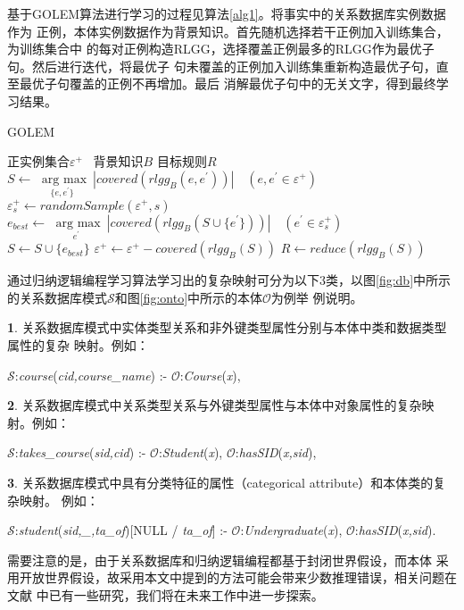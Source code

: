 基于GOLEM算法进行学习的过程见算法\ref{alg1}。将事实中的关系数据库实例数据作为
正例，本体实例数据作为背景知识。首先随机选择若干正例加入训练集合，为训练集合中
的每对正例构造RLGG，选择覆盖正例最多的RLGG作为最优子句。然后进行迭代，将最优子
句未覆盖的正例加入训练集重新构造最优子句，直至最优子句覆盖的正例不再增加。最后
消解最优子句中的无关文字，得到最终学习结果。
\renewcommand{\algorithmicinput}{\textbf{输入：}}
\renewcommand{\algorithmicoutput}{\textbf{输出：}}


\begin{algorithm}                      
\caption{GOLEM}          
\label{alg1}                           
\begin{algorithmic}[1]                    
\INPUT 正实例集合$\varepsilon^+$ \ 背景知识$B$
\OUTPUT 目标规则$R$
	\STATE $S \leftarrow \underset{\{e,e^\prime\}}{\operatorname{\ arg \ max}} \ |covered(rlgg_B(e,e^\prime))| \quad (e, e^\prime \in \varepsilon^+)$
	\REPEAT
	\STATE $ \varepsilon^+_s \leftarrow randomSample(\varepsilon^+,s)$ \\
	\STATE $e_{best} \leftarrow \underset{e^\prime}{\operatorname{\ arg \ max}} \ |covered(rlgg_B(S \cup \{e^\prime\}))|  \quad (e^\prime \in \varepsilon^+_s)$ \\
	\STATE $ S \leftarrow S \cup \{e_{best}\} $
	\STATE $ \varepsilon^+ \leftarrow \varepsilon^+ - covered(rlgg_B(S))$
	\STATE $ R \leftarrow reduce(rlgg_B(S))$
\end{algorithmic}
\end{algorithm}


通过归纳逻辑编程学习算法学习出的复杂映射可分为以下3类，以图\ref{fig:db}中所示
的关系数据库模式$\mathcal{S}$和图\ref{fig:onto}中所示的本体$\mathcal{O}$为例举
例说明。

\theoremstyle{definition}
\newtheorem{type}{}
\begin{type}
\label{typ1}
关系数据库模式中实体类型关系和非外键类型属性分别与本体中类和数据类型属性的复杂
映射。例如：

$\mathcal{S}$:\emph{course}(\emph{cid,course\_name}) :-
$\mathcal{O}$:\emph{Course}(\emph{x}),
\end{type}
\begin{type}
\label{typ2}
关系数据库模式中关系类型关系与外键类型属性与本体中对象属性的复杂映射。例如： 

$\mathcal{S}$:\emph{takes\_course}(\emph{sid,cid}) :-
$\mathcal{O}$:\emph{Student}(\emph{x}),
$\mathcal{O}$:\emph{hasSID}(\emph{x,sid}),
\end{type}
\begin{type}
\label{typ3}
关系数据库模式中具有分类特征的属性（categorical attribute）和本体类的复杂映射。
例如：

$\mathcal{S}$:\emph{student}(\emph{sid,\_,ta\_of})[NULL / \emph{ta\_of}] :-
$\mathcal{O}$:\emph{Undergraduate}(\emph{x}),
$\mathcal{O}$:\emph{hasSID}(\emph{x,sid}).
\end{type}

需要注意的是，由于关系数据库和归纳逻辑编程都基于封闭世界假设\cite{19}，而本体
采用开放世界假设，故采用本文中提到的方法可能会带来少数推理错误，相关问题在文献
\cite{20}中已有一些研究，我们将在未来工作中进一步探索。

